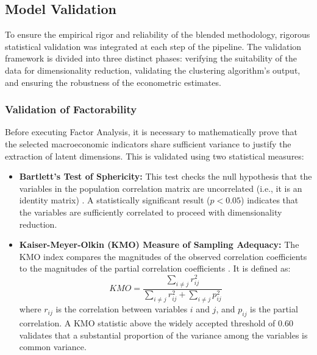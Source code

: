 \documentclass[a4paper,11pt]{article}
\begin{document}
\subsection{Model Validation}

To ensure the empirical rigor and reliability of the blended methodology, rigorous statistical validation was integrated at each step of the pipeline.
The validation framework is divided into three distinct phases: verifying the suitability of the data for dimensionality reduction, validating the clustering algorithm's output, and ensuring the robustness of the econometric estimates.

\subsubsection{Validation of Factorability}
Before executing Factor Analysis, it is necessary to mathematically prove that the selected macroeconomic indicators share sufficient variance to justify the extraction of latent dimensions.
This is validated using two statistical measures:
\begin{itemize}
    \item \textbf{Bartlett's Test of Sphericity:} This test checks the null hypothesis that the variables in the population correlation matrix are uncorrelated (i.e., it is an identity matrix) \parencite{bartlett1950}. A statistically significant result ($p < 0.05$) indicates that the variables are sufficiently correlated to proceed with dimensionality reduction.
    \item \textbf{Kaiser-Meyer-Olkin (KMO) Measure of Sampling Adequacy:} The KMO index compares the magnitudes of the observed correlation coefficients to the magnitudes of the partial correlation coefficients \parencite{kaiser1974}. It is defined as:
    \begin{equation}
        KMO = \frac{\sum_{i \neq j} r_{ij}^2}{\sum_{i \neq j} r_{ij}^2 + \sum_{i \neq j} p_{ij}^2}
    \end{equation}
    where $r_{ij}$ is the correlation between variables $i$ and $j$, and $p_{ij}$ is the partial correlation. A KMO statistic above the widely accepted threshold of 0.60 validates that a substantial proportion of the variance among the variables is common variance.
\end{itemize}
\end{document}
